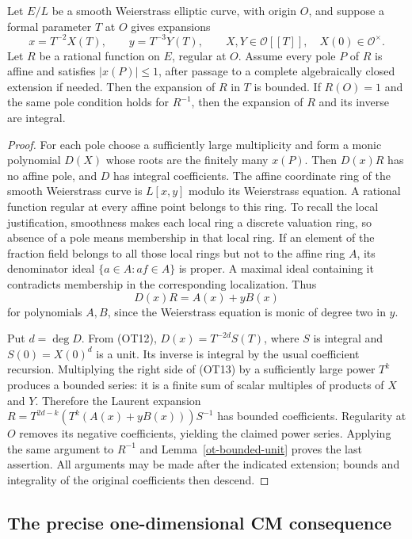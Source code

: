 \begin{proposition}\label{ot-elliptic-bounded}
Let $E/L$ be a smooth Weierstrass elliptic curve, with origin $O$,
and suppose a formal parameter $T$ at $O$ gives expansions
\[
 x=T^{-2}X(T),\qquad y=T^{-3}Y(T),\qquad
 X,Y\in\mathcal O[[T]],\quad X(0)\in\mathcal O^\times.
 \tag{OT12}
\]
Let $R$ be a rational function on $E$, regular at $O$.
Assume every pole $P$ of $R$ is affine and satisfies $|x(P)|\le1$,
after passage to a complete algebraically closed extension if needed.
Then the expansion of $R$ in $T$ is bounded.
If $R(O)=1$ and the same pole condition holds for $R^{-1}$, then
the expansion of $R$ and its inverse are integral.
\end{proposition}
\begin{proof}
For each pole choose a sufficiently large multiplicity and form a
monic polynomial $D(X)$ whose roots are the finitely many $x(P)$.
Then $D(x)R$ has no affine pole, and $D$ has integral coefficients.
The affine coordinate ring of the smooth Weierstrass curve is
$L[x,y]$ modulo its Weierstrass equation.  A rational function
regular at every affine point belongs to this ring.  To recall
the local justification, smoothness makes each local ring a
discrete valuation ring, so absence of a pole means membership in
that local ring.  If an element of the fraction field belongs to
all those local rings but not to the affine ring $A$, its
denominator ideal $\{a\in A:af\in A\}$ is proper.  A maximal
ideal containing it contradicts membership in the corresponding
localization.  Thus
\[
                        D(x)R=A(x)+yB(x)
 \tag{OT13}
\]
for polynomials $A,B$, since the Weierstrass equation is monic of
degree two in $y$.

Put $d=\deg D$.  From (OT12),
$D(x)=T^{-2d}S(T)$, where $S$ is integral and
$S(0)=X(0)^d$ is a unit.  Its inverse is integral by the usual
coefficient recursion.  Multiplying the right side of (OT13)
by a sufficiently large power $T^k$ produces a bounded series:
it is a finite sum of scalar multiples of products of $X$ and
$Y$.  Therefore the Laurent expansion
$R=T^{2d-k}(T^k(A(x)+yB(x)))S^{-1}$ has bounded coefficients.
Regularity at $O$ removes its negative coefficients, yielding the
claimed power series.  Applying the same argument to $R^{-1}$
and Lemma~\ref{ot-bounded-unit} proves the last assertion.
All arguments may be made after the indicated extension; bounds
and integrality of the original coefficients then descend.
\end{proof}

\subsection{The precise one-dimensional CM consequence}


